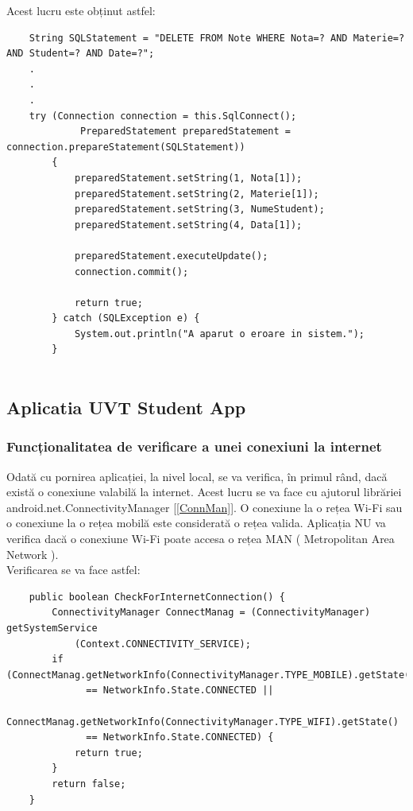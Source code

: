 \documentclass{article}
\begin{document}
		Acest lucru este obținut astfel:
	\begin{verbatim}
    String SQLStatement = "DELETE FROM Note WHERE Nota=? AND Materie=? AND Student=? AND Date=?";
    .
    .   
    .
    try (Connection connection = this.SqlConnect();
             PreparedStatement preparedStatement = connection.prepareStatement(SQLStatement))
        {
            preparedStatement.setString(1, Nota[1]);
            preparedStatement.setString(2, Materie[1]);
            preparedStatement.setString(3, NumeStudent);
            preparedStatement.setString(4, Data[1]);

            preparedStatement.executeUpdate();
            connection.commit();

            return true;
        } catch (SQLException e) {
            System.out.println("A aparut o eroare in sistem.");
        }
    
	\end{verbatim}
		\subsection{Aplicatia UVT Student App}

			\subsubsection{Funcționalitatea de verificare a unei conexiuni la internet}

		Odată cu pornirea aplicației, la nivel local, se va verifica, în primul rând, dacă există o conexiune valabilă la internet. Acest lucru se va face cu ajutorul librăriei android.net.ConnectivityManager [\ref{ConnMan}]. O conexiune la o rețea Wi-Fi sau o conexiune la o rețea mobilă este considerată o rețea valida. Aplicația NU va verifica dacă o conexiune Wi-Fi poate accesa o rețea MAN ( Metropolitan Area Network ).\\

		Verificarea se va face astfel: 
		\begin{verbatim}
    public boolean CheckForInternetConnection() {
        ConnectivityManager ConnectManag = (ConnectivityManager) getSystemService
            (Context.CONNECTIVITY_SERVICE);
        if (ConnectManag.getNetworkInfo(ConnectivityManager.TYPE_MOBILE).getState() 
              == NetworkInfo.State.CONNECTED ||
        ConnectManag.getNetworkInfo(ConnectivityManager.TYPE_WIFI).getState() 
              == NetworkInfo.State.CONNECTED) {
            return true;
        }
        return false;
    }
		\end{verbatim}
\end{document}
